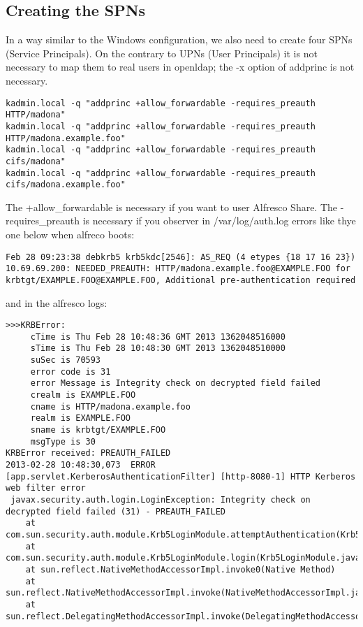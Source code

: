 \documentclass[12pt,a4]{article}
\begin{document}
\subsection{Creating the SPNs}
In a way similar to the Windows configuration, we also need to create four SPNs (Service Principals). On the contrary to UPNs (User Principals) it is not necessary to map them to real users in openldap; the -x option of addprinc is not necessary.
\begin{verbatim}
kadmin.local -q "addprinc +allow_forwardable -requires_preauth HTTP/madona"
kadmin.local -q "addprinc +allow_forwardable -requires_preauth HTTP/madona.example.foo"
kadmin.local -q "addprinc +allow_forwardable -requires_preauth cifs/madona"
kadmin.local -q "addprinc +allow_forwardable -requires_preauth cifs/madona.example.foo"
\end{verbatim}


The +allow\_forwardable is necessary if you want to user Alfresco Share.
The -requires\_preauth is necessary if you observer in /var/log/auth.log errors like thye one below when alfreco boots:
\begin{verbatim}
Feb 28 09:23:38 debkrb5 krb5kdc[2546]: AS_REQ (4 etypes {18 17 16 23}) 10.69.69.200: NEEDED_PREAUTH: HTTP/madona.example.foo@EXAMPLE.FOO for krbtgt/EXAMPLE.FOO@EXAMPLE.FOO, Additional pre-authentication required
\end{verbatim}
and in the alfresco logs:
\begin{verbatim}
>>>KRBError:
	 cTime is Thu Feb 28 10:48:36 GMT 2013 1362048516000
	 sTime is Thu Feb 28 10:48:30 GMT 2013 1362048510000
	 suSec is 70593
	 error code is 31
	 error Message is Integrity check on decrypted field failed
	 crealm is EXAMPLE.FOO
	 cname is HTTP/madona.example.foo
	 realm is EXAMPLE.FOO
	 sname is krbtgt/EXAMPLE.FOO
	 msgType is 30
KRBError received: PREAUTH_FAILED
2013-02-28 10:48:30,073  ERROR [app.servlet.KerberosAuthenticationFilter] [http-8080-1] HTTP Kerberos web filter error
 javax.security.auth.login.LoginException: Integrity check on decrypted field failed (31) - PREAUTH_FAILED
	at com.sun.security.auth.module.Krb5LoginModule.attemptAuthentication(Krb5LoginModule.java:696)
	at com.sun.security.auth.module.Krb5LoginModule.login(Krb5LoginModule.java:542)
	at sun.reflect.NativeMethodAccessorImpl.invoke0(Native Method)
	at sun.reflect.NativeMethodAccessorImpl.invoke(NativeMethodAccessorImpl.java:39)
	at sun.reflect.DelegatingMethodAccessorImpl.invoke(DelegatingMethodAccessorImpl.java:25)
\end{verbatim}
\end{document}
